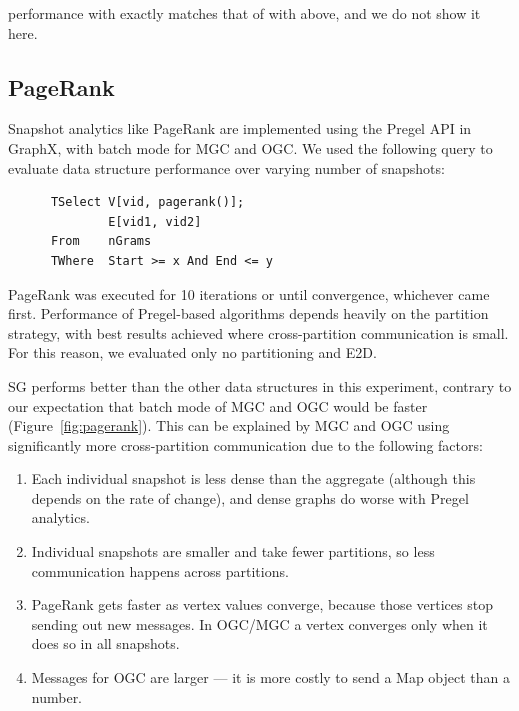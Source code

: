  performance with  exactly matches that of
 with  above, and we do not show it here.

\subsection{PageRank}

Snapshot analytics like PageRank are implemented using
the Pregel API in GraphX, with batch mode for MGC and OGC.  We used
the following query to evaluate data structure performance over
varying number of snapshots:

\begin{small}
\begin{verbatim}
      TSelect V[vid, pagerank()];
              E[vid1, vid2]
      From    nGrams
      TWhere  Start >= x And End <= y
\end{verbatim}
\end{small}

PageRank was executed for 10 iterations or until convergence,
whichever came first.  Performance of Pregel-based algorithms depends
heavily on the partition strategy, with best results achieved where
cross-partition communication is small.  For this reason, we evaluated
only no partitioning and E2D.

SG performs better than the other data structures in this experiment,
contrary to our expectation that batch mode of MGC and OGC would be
faster (Figure~\ref{fig:pagerank}).  This can be explained by MGC and
OGC using significantly more cross-partition communication due to the
following factors:

\begin{enumerate}[leftmargin=*]
\item Each individual snapshot is less dense than the aggregate
  (although this depends on the rate of change), and dense graphs do
  worse with Pregel analytics.
\item Individual snapshots are smaller and take fewer partitions, so
  less communication happens across partitions.
\item PageRank gets faster as vertex values converge, because those
  vertices stop sending out new messages.  In OGC/MGC a vertex converges
  only when it does so in all snapshots.
\item Messages for OGC are larger --- it is more costly to send a Map
  object than a number.
\end{enumerate}

